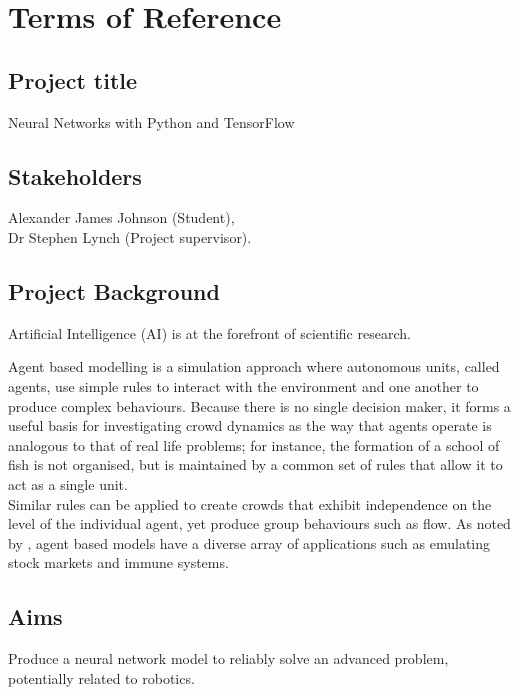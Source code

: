 \chapter*{Terms of Reference}

\section*{Project title}
Neural Networks with Python and TensorFlow

\section*{Stakeholders}
Alexander James Johnson (Student),\\
Dr Stephen Lynch (Project supervisor).

\section*{Project Background}
Artificial Intelligence (AI) is at the forefront of scientific research.


Agent based modelling is a simulation approach where autonomous units, called agents, use simple rules to interact with the environment and one another to produce complex behaviours.
Because there is no single decision maker, it forms a useful basis for investigating crowd dynamics as the way that agents operate is analogous to that of real life problems; for instance, the formation of a school of fish is not organised, but is maintained by a common set of rules that allow it to act as a single unit.\\
Similar rules can be applied to create crowds that exhibit independence on the level of the individual agent, yet produce group behaviours such as flow.
As noted by \citet{Macal:2010}, agent based models have a diverse array of applications such as emulating stock markets and immune systems.

\section*{Aims}
Produce a neural network model to reliably solve an advanced problem,
potentially related to robotics.


